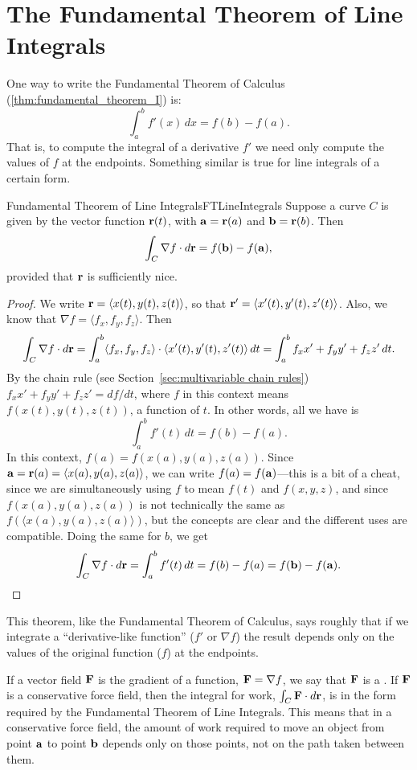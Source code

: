 \section{The Fundamental Theorem of Line Integrals}\label{sec:FundamentalTheoremLineIntegrals}

One way to write the Fundamental Theorem of Calculus
(\ref{thm:fundamental_theorem_I}) is:
$$\int_a^b f'(x)\,dx = f(b)-f(a).$$
That is, to compute the integral of a derivative $f'$ 
we need only compute the values of $f$ at the endpoints. Something
similar is true for line integrals of a certain form.

\begin{theorem}{Fundamental Theorem of Line Integrals}{FTLineIntegrals}
Suppose a curve $C$ is
given by the vector function ${\bf r}(t)$, with ${\bf a}={\bf r}(a)$
and ${\bf b}={\bf r}(b)$. Then
$$\int_C \nabla f\cdot d{\bf r} = f({\bf b})-f({\bf a}),$$
provided that $\bf r$ is sufficiently nice.
\end{theorem}
\begin{proof}
We write ${\bf r}=\langle x(t),y(t),z(t)\rangle$, so 
that ${\bf r}'=\langle x'(t),y'(t),z'(t)\rangle$. Also,
we know that $\nabla f=\langle f_x,f_y,f_z\rangle$. Then
$$\int_C \nabla f\cdot d{\bf r} = 
\int_a^b \langle f_x,f_y,f_z\rangle\cdot\langle
x'(t),y'(t),z'(t)\rangle\,dt=
\int_a^b f_x x'+f_y y'+f_z z' \,dt.$$
By the chain rule (see Section~\ref{sec:multivariable chain rules})
$f_x x'+f_y y'+f_z z'=df/dt$, where $f$ in this context means
$f(x(t),y(t),z(t))$, a function of $t$. In other words, all we have is
$$\int_a^b f'(t)\,dt=f(b)-f(a).$$
In this context,
$f(a)=f(x(a),y(a),z(a))$.
Since ${\bf a}={\bf r}(a)=\langle x(a),y(a),z(a)\rangle$, we can
write $f(a)=f({\bf a})$---this is a bit of a cheat, since we are
simultaneously using $f$ to mean $f(t)$ and $f(x,y,z)$, and since
$f(x(a),y(a),z(a))$ is not technically the same as 
$f(\langle x(a),y(a),z(a)\rangle)$,
but the
concepts are clear and the different uses are compatible. Doing the
same for $b$, we get
$$\int_C \nabla f\cdot d{\bf r} = \int_a^b f'(t)\,dt=f(b)-f(a)=f({\bf
  b})-f({\bf a}).$$ 
\end{proof}

This theorem, like the Fundamental Theorem of Calculus, says roughly
that if we integrate a ``derivative-like function'' ($f'$ or $\nabla
f$) the result depends only on the values of the original function ($f$)
at the endpoints.

If a vector field $\bf F$ is the gradient of a function, ${\bf
  F}=\nabla f$, we say that $\bf F$ is a .
If $\bf F$ is a conservative force field, then the integral for work,
$\int_C {\bf F}\cdot d{\bf r}$, is in the form required by the
Fundamental Theorem of Line Integrals. This means that in a
conservative force field, the amount of work required to move an
object from point $\bf a$ to point $\bf b$ depends only on those
points, not on the path taken between them.

